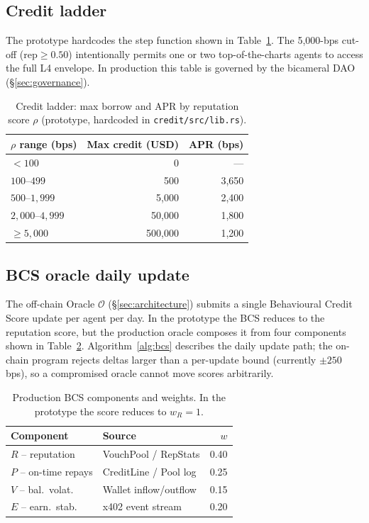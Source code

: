 \documentclass[10pt,conference,letterpaper]{IEEEtran}
\theoremstyle{definition}
\begin{document}
\subsection{Credit ladder}

The prototype hardcodes the step function shown in
Table~\ref{tab:credit-ladder}. The 5{,}000-bps cut-off ($\mathrm{rep}
\ge 0.50$) intentionally permits one or two top-of-the-charts agents
to access the full L4 envelope. In production this table is governed
by the bicameral DAO (\S\ref{sec:governance}).

\begin{table}[t]
\caption{Credit ladder: max borrow and APR by reputation score $\rho$
(prototype, hardcoded in \texttt{credit/src/lib.rs}).}
\label{tab:credit-ladder}
\centering
\small
\begin{tabular}{lrr}
\toprule
\textbf{$\rho$ range (bps)} & \textbf{Max credit (USD)} & \textbf{APR (bps)} \\
\midrule
$<100$         & 0          & ---     \\
$100\text{--}499$    & 500        & 3{,}650 \\
$500\text{--}1{,}999$    & 5{,}000    & 2{,}400 \\
$2{,}000\text{--}4{,}999$ & 50{,}000   & 1{,}800 \\
$\ge 5{,}000$    & 500{,}000  & 1{,}200 \\
\bottomrule
\end{tabular}
\end{table}

\subsection{BCS oracle daily update}

The off-chain Oracle $\mathcal{O}$ (\S\ref{sec:architecture}) submits a
single Behavioural Credit Score update per agent per day. In the
prototype the BCS reduces to the reputation score, but the production
oracle composes it from four components shown in Table~\ref{tab:bcs}.
Algorithm~\ref{alg:bcs} describes the daily update path; the on-chain
program rejects deltas larger than a per-update bound (currently
$\pm 250$ bps), so a compromised oracle cannot move scores arbitrarily.

\begin{table}[t]
\caption{Production BCS components and weights. In the prototype the
score reduces to $w_R = 1$.}
\label{tab:bcs}
\centering
\small
\begin{tabularx}{\columnwidth}{lXr}
\toprule
\textbf{Component} & \textbf{Source} & \textbf{$w$} \\
\midrule
$R$ -- reputation     & VouchPool / RepStats   & 0.40 \\
$P$ -- on-time repays & CreditLine / Pool log  & 0.25 \\
$V$ -- bal.\ volat.   & Wallet inflow/outflow  & 0.15 \\
$E$ -- earn.\ stab.   & x402 event stream      & 0.20 \\
\bottomrule
\end{tabularx}
\end{table}
\end{document}
